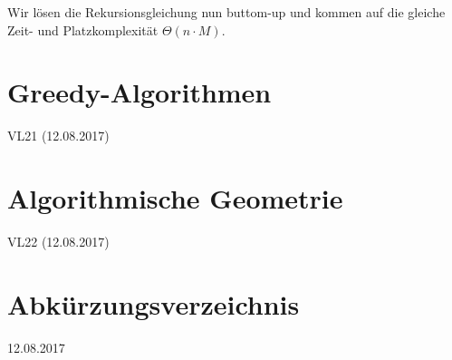 \documentclass[12pt]{article}
\begin{document}
Wir lösen die Rekursionsgleichung nun buttom-up und kommen auf die gleiche Zeit- und Platzkomplexität $\Theta(n\cdot M)$.

\section{Greedy-Algorithmen}

VL21 (12.08.2017)

\section{Algorithmische Geometrie}

VL22 (12.08.2017)

\section{Abkürzungsverzeichnis}

12.08.2017
\end{document}
